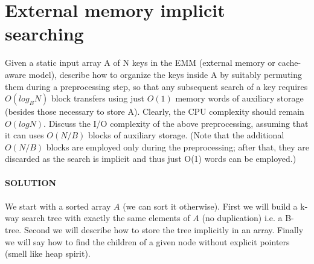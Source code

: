 \documentclass[a4paper]{article}
\begin{document}
\section*{External memory implicit searching}
Given a static input array A of N keys in the
EMM (external memory or cache-aware model), describe how to organize the keys
inside A by suitably permuting them during a preprocessing step, so that any subsequent
search of a key requires $O(log_B N)$ block transfers using just $O(1)$ memory words
of auxiliary storage (besides those necessary to store A). Clearly, the CPU complexity
should remain $O(log N)$. Discuss the I/O complexity of the above preprocessing,
assuming that it can uses $O(N/B)$ blocks of auxiliary storage. (Note that the additional
$O(N/B)$ blocks are employed only during the preprocessing; after that, they are
discarded as the search is implicit and thus just O(1) words can be employed.)
\\
\\
\textbf{SOLUTION}
\\
\\
We start with a sorted array $A$ (we can sort it otherwise).
First we will build a k-way search tree with exactly the same elements of $A$ (no duplication) i.e. a B-tree.
Second we will describe how to store the tree implicitly in an array.
Finally we will say how to find the children of a given node without explicit pointers (smell like heap spirit).

\
\end{document}
